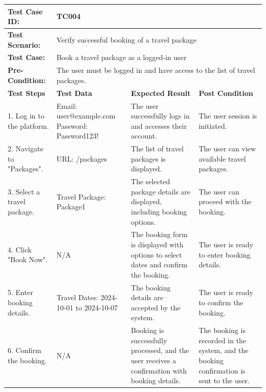 \documentclass{scrreprt}
\begin{document}
\vspace{1cm}

\begin{longtable}{| m{2cm} | m{5cm} | m{4cm} | m{3cm} |}
\hline

\textbf{Test Case ID:} & \multicolumn{3}{l|}{TC004} \\ \hline
\textbf{Test Scenario:} & \multicolumn{3}{l|}{Verify successful booking of a travel package} \\ \hline
\textbf{Test Case:} & \multicolumn{3}{l|}{Book a travel package as a logged-in user} \\ \hline
\textbf{Pre-Condition:} & \multicolumn{3}{l|}{The user must be logged in and have access to the list of travel packages.} \\ \hline
\textbf{Test Steps} & \textbf{Test Data} & \textbf{Expected Result} & \textbf{Post Condition} \\ \hline
1. Log in to the platform. & Email: user@example.com \newline Password: Password123! & The user successfully logs in and accesses their account. & The user session is initiated. \\ \hline
2. Navigate to "Packages". & URL: /packages & The list of travel packages is displayed. & The user can view available travel packages. \\ \hline
3. Select a travel package. & Travel Package: Package1 & The selected package details are displayed, including booking options. & The user can proceed with the booking. \\ \hline
4. Click "Book Now". & N/A & The booking form is displayed with options to select dates and confirm the booking. & The user is ready to enter booking details. \\ \hline
5. Enter booking details. & Travel Dates: 2024-10-01 to 2024-10-07 & The booking details are accepted by the system. & The user is ready to confirm the booking. \\ \hline
6. Confirm the booking. & N/A & Booking is successfully processed, and the user receives a confirmation with booking details. & The booking is recorded in the system, and the booking confirmation is sent to the user. \\ \hline
\end{longtable}

\vspace{1cm}
\end{document}
